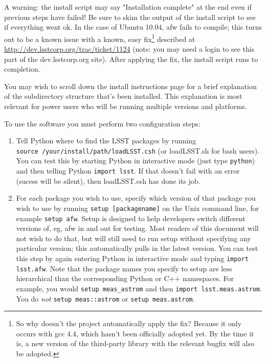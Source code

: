\documentclass{book}
\def\t{\texttt}
\begin{document}
A warning: the install script may say "Installation complete" at the
end even if previous steps have failed!  Be sure to skim the output of
the install script to see if everything went ok.  In the case of
Ubuntu 10.04, afw fails to compile; this turns out to be a known issue
with a known, easy fix\footnote{So why doesn't the project
  automatically apply the fix?  Because it only occurs with gcc 4.4,
  which hasn't been officially adopted yet. By the time it is, a new
  version of the third-party library with the relevant bugfix will
  also be adopted.} described at
\url{http://dev.lsstcorp.org/trac/ticket/1124} (note: you may need a
login to see this part of the dev.lsstcorp.org site).  After applying
the fix, the install script runs to completion.

You may wish to scroll down the install instructions page for a brief
explanation of the subdirectory structure that's been installed.  This
explanation is most relevant for power users who will be running
multiple versions and platforms.

To use the software you must perform two configuration steps:
\begin{enumerate}
\item Tell Python where to find the LSST packages by
  running \\ \texttt{source /your/install/path/loadLSST.csh} (or loadLSST.sh
  for bash users).  You can test this by starting Python in
  interactive mode (just type \texttt{python}) and then telling Python
  \texttt{import lsst}.  If that doesn't fail with an error (sucess
  will be silent), then loadLSST.csh has done its job.

\item For each package you wish to use, specify which version of that
  package you wish to use by running \texttt{setup [packagename]} on the
  Unix command line, for example \texttt{setup afw}.  Setup is designed to
  help developers switch different versions of, eg, afw in and out for
  testing.  Most readers of this document will not wish to do that,
  but will still need to run setup without specifying any particular
  version; this automatically pulls in the latest version.  You can
  test this step by again entering Python in interactive mode and
  typing \texttt{import lsst.afw}.  Note that the package names you specify
  to setup are less hierarchical than the corresponding Python or C++
  namespaces.  For example, you would \t{setup meas\_astrom} and then
  \t{import lsst.meas.astrom}.  You do {\it not} \t{setup meas::astrom} or 
  \t{setup meas.astrom}.

\end{enumerate}
\end{document}

